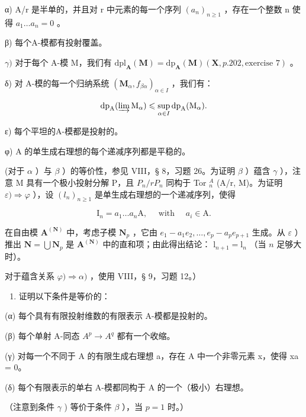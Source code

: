 α) A/r 是半单的，并且对 r 中元素的每一个序列 \((a_{n})_{n\geq1}\) ，存在一个整数 n 使得 \(a_{1}\ldots a_{n}=0\) 。

β) 每个A-模都有投射覆盖。

\(\gamma)\) 对于每个 A-模 M，我们有 \(\mathrm{dpl}_{\mathbf{A}}(\mathbf{M}) = \mathrm{dp}_{\mathbf{A}}(\mathbf{M})(\mathbf{X}, p. 202, \text{exercise } 7)\) 。

δ) 对 A-模的每一个归纳系统 \((\mathbf{M}_{\alpha}, f_{\beta\alpha})_{\alpha \in I}\) ，我们有：

\[
\mathrm{dp} _ {\mathrm{A}} (\varinjlim \mathrm{M} _ {\alpha}) \leqslant \sup _ {\alpha \in I} \mathrm{dp} _ {\mathrm{A}} (\mathrm{M} _ {\alpha}).
\]

ε) 每个平坦的A-模都是投射的。

φ) A 的单生成右理想的每个递减序列都是平稳的。

(对于 \(\alpha\) ）与 \(\beta\) ）的等价性，参见 VIII，§ 8，习题 26。为证明 \(\beta\) ）蕴含 \(\gamma\) ），注意 M 具有一个极小投射分解 P，且 \(P_n/rP_n\) 同构于 Tor \(_n^A\) (A/r, M)。为证明 \(\varepsilon) \Rightarrow \varphi\) ），设 \((l_n)_{n \geq 1}\) 是单生成右理想的一个递减序列，使得

\[
\mathrm{I} _ {n} = a _ {1} \dots a _ {n} \mathrm{A}, \quad \text { with } \quad a _ {i} \in \mathrm{A}.
\]

在自由模 \(\mathbf{A}^{(\mathbf{N})}\) 中，考虑子模 \(\mathbf{N}_p\) ，它由 \(e_1 - a_1 e_2, \ldots, e_p - a_p e_{p+1}\) 生成。从 \(\varepsilon\) ）推出 \(\mathbf{N} = \bigcup \mathbf{N}_p\) 是 \(\mathbf{A}^{(\mathbf{N})}\) 中的直和项；由此得出结论： \(\mathrm{l}_{n+1} = \mathrm{l}_n\) （当 \(n\) 足够大时）。

对于蕴含关系 \(\varphi) \Rightarrow \alpha)\) ，使用 VIII，§ 9，习题 12。）

\begin{enumerate}
\def\labelenumi{\arabic{enumi})}
\setcounter{enumi}{21}
\tightlist
\item
  证明以下条件是等价的：
\end{enumerate}

(α) 每个具有有限投射维数的有限表示 A-模都是投射的。

(β) 每个单射 A-同态 \(A^{p} \rightarrow A^{q}\) 都有一个收缩。

(γ) 对每一个不同于 A 的有限生成右理想 a，存在 A 中一个非零元素 x，使得 xa = 0。

(δ) 每个有限表示的单右 A-模都同构于 A 的一个（极小）右理想。

（注意到条件 \(\gamma\) ) 等价于条件 \(\beta\) ），当 \(p = 1\) 时。）

